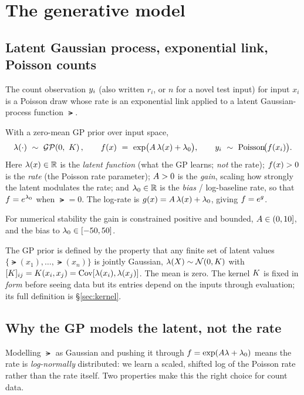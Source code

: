 \section{The generative model}
\label{sec:genmodel}

\subsection{Latent Gaussian process, exponential link, Poisson counts}

The count observation $y_i$ (also written $r_i$, or $n$ for a novel test input)
for input $x_i$ is a Poisson draw whose rate is an exponential link applied to a
latent Gaussian-process function $\lat$.

\begin{definition}
\label{eq:genmodel}
With a zero-mean GP prior over input space,
\begin{equation}
\lat(\cdot)\ \sim\ \GProc\!\left(0,\ \Kf\right),
\qquad
\rate(x)\ =\ \exp\!\big(\gain\,\lat(x)+\latz\big),
\qquad
\spk_i\ \sim\ \Poi\!\big(\rate(x_i)\big).
\end{equation}
Here $\lambda(x)\in\mathbb{R}$ is the \emph{latent function} (what the GP learns;
\emph{not} the rate); $f(x)>0$ is the \emph{rate} (the Poisson rate
parameter); $A>0$ is the \emph{gain}, scaling how strongly the latent
modulates the rate; and $\lambda_{0}\in\mathbb{R}$ is the \emph{bias} / log-baseline
rate, so that $f=e^{\lambda_{0}}$ when $\lat=0$. The log-rate is
$g(x)=A\,\lambda(x)+\lambda_{0}$, giving $f=e^{g}$.
\end{definition}

For numerical stability the gain is constrained positive and bounded,
$A\in(0,10]$, and the bias to $\lambda_{0}\in[-50,50]$.

The GP prior is defined by the property that any finite set of latent values
$\{\lat(x_1),\dots,\lat(x_n)\}$ is jointly Gaussian, $\lambda(X)\sim\mathcal{N}(0,K)$
with $[K]_{ij}=K(x_i,x_j)=\mathrm{Cov}[\lambda(x_i),\lambda(x_j)]$. The mean is
zero. The kernel $K$ is fixed in \emph{form} before seeing data but its entries
depend on the inputs through evaluation; its full definition is
\S\ref{sec:kernel}.

\subsection{Why the GP models the latent, not the rate}

Modelling $\lat$ as Gaussian and pushing it through $f=\exp(A\lambda+\lambda_{0})$
means the rate is \emph{log-normally} distributed: we learn a scaled, shifted log
of the Poisson rate rather than the rate itself. Two properties make this the
right choice for count data.


